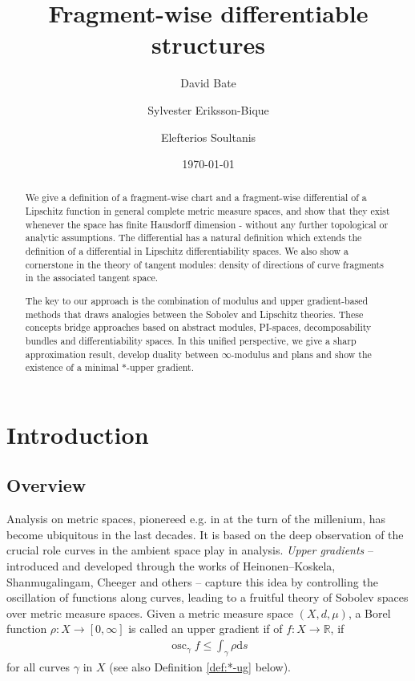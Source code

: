 \documentclass{amsart}
\title{Fragment-wise differentiable structures}
\author{David Bate}
\author{Sylvester Eriksson-Bique}
\author{Elefterios Soultanis}
\date{\today}
\numberwithin{equation}{section}
\newcommand{\R}{\mathbb{R}}
\newcommand{\ud}{\mathrm {d}}
\begin{document}
\begin{abstract}
    We give a definition of a fragment-wise chart and a fragment-wise differential of a Lipschitz function in general complete metric measure spaces, and show that they exist whenever the space has finite Hausdorff dimension - without any further topological or analytic assumptions. The differential has a natural definition which extends the definition of a differential in Lipschitz differentiability spaces. We also show a cornerstone in the theory of tangent modules: density of directions of curve fragments in the associated tangent space. 

    The key to our approach is the combination of modulus and upper gradient-based methods that draws analogies between the Sobolev and Lipschitz theories. These concepts bridge approaches based on abstract modules, PI-spaces,  decomposability bundles and differentiability spaces. In this unified perspective, we give a sharp approximation result,  develop duality between $\infty$-modulus and plans and show the existence of a minimal $*$-upper gradient.
\end{abstract}

\maketitle

\tableofcontents




\section{Introduction}

\subsection{Overview} 

Analysis on metric spaces, pionereed e.g. in \cite{che99,hei98} at the turn of the millenium, has become ubiquitous in the last decades. It is based on the deep observation of the crucial role {curves} in the ambient space play in analysis. \emph{Upper gradients} -- introduced and developed through the works of Heinonen--Koskela, Shanmugalingam, Cheeger and others \cite{hei98, che99, sha00, hei01} -- capture this idea by controlling the oscillation of functions along curves, leading to a fruitful theory of Sobolev spaces over metric measure spaces. Given a metric measure space $(X,d,\mu)$, a Borel function $\rho:X\to [0,\infty]$ is called an upper gradient if of $f:X\to \R$, if 
\begin{align}\label{eq:ug}
    \operatorname{osc}_\gamma f\le \int_\gamma \rho\ud s
\end{align}
for all curves $\gamma$ in $X$ (see also Definition \ref{def:*-ug} below).
\end{document}
